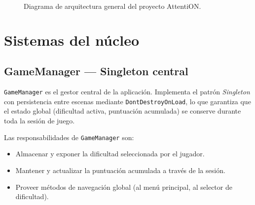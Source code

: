 \documentclass[12pt, a4paper]{report}
\begin{document}
\begin{figure}[H]
  \centering
  \caption{Diagrama de arquitectura general del proyecto AttentiON.}
  \label{fig:arquitectura}
\end{figure}

\section{Sistemas del núcleo}

\subsection{GameManager — Singleton central}

\texttt{GameManager} es el gestor central de la aplicación. Implementa el
patrón \textit{Singleton} con persistencia entre escenas mediante
\texttt{DontDestroyOnLoad}, lo que garantiza que el estado global (dificultad
activa, puntuación acumulada) se conserve durante toda la sesión de juego.

Las responsabilidades de \texttt{GameManager} son:

\begin{itemize}
  \item Almacenar y exponer la dificultad seleccionada por el jugador.
  \item Mantener y actualizar la puntuación acumulada a través de la sesión.
  \item Proveer métodos de navegación global (al menú principal, al selector
    de dificultad).
\end{itemize}
\end{document}
